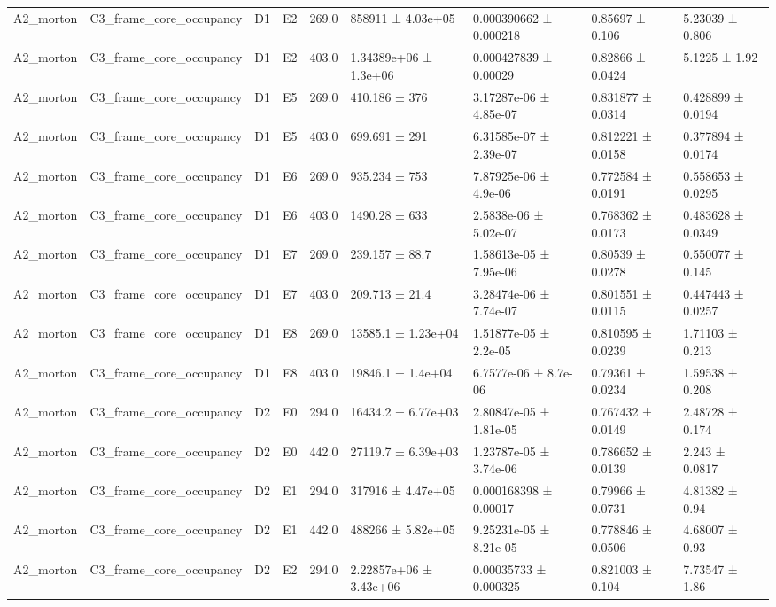 \begin{table}
\begin{tabular}{lllllllll}
A2\_morton & C3\_frame\_core\_occupancy & D1 & E2 & 269.0 & 858911 ± 4.03e+05 & 0.000390662 ± 0.000218 & 0.85697 ± 0.106 & 5.23039 ± 0.806 \\
A2\_morton & C3\_frame\_core\_occupancy & D1 & E2 & 403.0 & 1.34389e+06 ± 1.3e+06 & 0.000427839 ± 0.00029 & 0.82866 ± 0.0424 & 5.1225 ± 1.92 \\
A2\_morton & C3\_frame\_core\_occupancy & D1 & E5 & 269.0 & 410.186 ± 376 & 3.17287e-06 ± 4.85e-07 & 0.831877 ± 0.0314 & 0.428899 ± 0.0194 \\
A2\_morton & C3\_frame\_core\_occupancy & D1 & E5 & 403.0 & 699.691 ± 291 & 6.31585e-07 ± 2.39e-07 & 0.812221 ± 0.0158 & 0.377894 ± 0.0174 \\
A2\_morton & C3\_frame\_core\_occupancy & D1 & E6 & 269.0 & 935.234 ± 753 & 7.87925e-06 ± 4.9e-06 & 0.772584 ± 0.0191 & 0.558653 ± 0.0295 \\
A2\_morton & C3\_frame\_core\_occupancy & D1 & E6 & 403.0 & 1490.28 ± 633 & 2.5838e-06 ± 5.02e-07 & 0.768362 ± 0.0173 & 0.483628 ± 0.0349 \\
A2\_morton & C3\_frame\_core\_occupancy & D1 & E7 & 269.0 & 239.157 ± 88.7 & 1.58613e-05 ± 7.95e-06 & 0.80539 ± 0.0278 & 0.550077 ± 0.145 \\
A2\_morton & C3\_frame\_core\_occupancy & D1 & E7 & 403.0 & 209.713 ± 21.4 & 3.28474e-06 ± 7.74e-07 & 0.801551 ± 0.0115 & 0.447443 ± 0.0257 \\
A2\_morton & C3\_frame\_core\_occupancy & D1 & E8 & 269.0 & 13585.1 ± 1.23e+04 & 1.51877e-05 ± 2.2e-05 & 0.810595 ± 0.0239 & 1.71103 ± 0.213 \\
A2\_morton & C3\_frame\_core\_occupancy & D1 & E8 & 403.0 & 19846.1 ± 1.4e+04 & 6.7577e-06 ± 8.7e-06 & 0.79361 ± 0.0234 & 1.59538 ± 0.208 \\
A2\_morton & C3\_frame\_core\_occupancy & D2 & E0 & 294.0 & 16434.2 ± 6.77e+03 & 2.80847e-05 ± 1.81e-05 & 0.767432 ± 0.0149 & 2.48728 ± 0.174 \\
A2\_morton & C3\_frame\_core\_occupancy & D2 & E0 & 442.0 & 27119.7 ± 6.39e+03 & 1.23787e-05 ± 3.74e-06 & 0.786652 ± 0.0139 & 2.243 ± 0.0817 \\
A2\_morton & C3\_frame\_core\_occupancy & D2 & E1 & 294.0 & 317916 ± 4.47e+05 & 0.000168398 ± 0.00017 & 0.79966 ± 0.0731 & 4.81382 ± 0.94 \\
A2\_morton & C3\_frame\_core\_occupancy & D2 & E1 & 442.0 & 488266 ± 5.82e+05 & 9.25231e-05 ± 8.21e-05 & 0.778846 ± 0.0506 & 4.68007 ± 0.93 \\
A2\_morton & C3\_frame\_core\_occupancy & D2 & E2 & 294.0 & 2.22857e+06 ± 3.43e+06 & 0.00035733 ± 0.000325 & 0.821003 ± 0.104 & 7.73547 ± 1.86 \\

\end{tabular}
\end{table}
